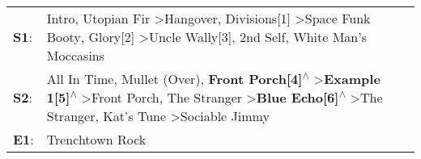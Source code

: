 \begin{supertabular}{p{0.03\textwidth}p{0.92\textwidth}}
 \textbf{S1}:  &                                                                                                                            Intro\textsuperscript{}, \enspace Utopian Fir\textsuperscript{} \textgreater \enspace Hangover\textsuperscript{}, \enspace Divisions[1]\textsuperscript{} \textgreater \enspace Space Funk Booty\textsuperscript{}, \enspace Glory[2]\textsuperscript{} \textgreater \enspace Uncle Wally[3]\textsuperscript{}, \enspace 2nd Self\textsuperscript{}, \enspace White Man's Moccasins\textsuperscript{}  \enspace  \\
 \textbf{S2}:  &  All In Time\textsuperscript{}, \enspace Mullet (Over)\textsuperscript{}, \enspace \textbf{Front Porch[4]\textsuperscript{$\wedge$}} \textgreater \enspace \textbf{Example 1[5]\textsuperscript{$\wedge$}} \textgreater \enspace Front Porch\textsuperscript{}, \enspace The Stranger\textsuperscript{} \textgreater \enspace \textbf{Blue Echo[6]\textsuperscript{$\wedge$}} \textgreater \enspace The Stranger\textsuperscript{}, \enspace Kat's Tune\textsuperscript{} \textgreater \enspace Sociable Jimmy\textsuperscript{}  \enspace  \\
 \textbf{E1}:  &                                                                                                                                                                                                                                                                                                                                                                                                                                                                                                Trenchtown Rock\textsuperscript{}  \enspace  \\
\end{supertabular}
